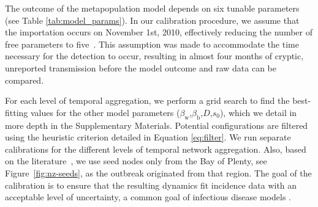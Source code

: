 \documentclass[aps,physrev,reprint,superscriptaddress]{revtex4-1}
\begin{document}
The outcome of the metapopulation model depends on six tunable parameters (see Table \ref{tab:model_params}). In our calibration procedure, we assume that the importation occurs on November 1st, 2010, effectively reducing the number of free parameters to five~\cite{rosanowski2013quantification,greer2012costs}. This assumption was made to accommodate the time necessary for the detection to occur, resulting in almost four months of cryptic, unreported transmission before the model outcome and raw data can be compared.

For each level of temporal aggregation, we perform a grid search to find the best-fitting values for the other model parameters ($\beta_\mathrm{w}$,$\beta_\mathrm{b}$,$D$,$s_0$), which we detail in more depth in the Supplementary Materials. Potential configurations are filtered using the heuristic criterion detailed in Equation \ref{eq:filter}. We run separate calibrations for the different levels of temporal network aggregation. Also, based on the literature~\cite{rosanowski2013quantification,greer2012costs}, we use seed nodes only from the Bay of Plenty, see Figure~\ref{fig:nz-seeds}, as the outbreak originated from that region. The goal of the calibration is to ensure that the resulting dynamics fit incidence data with an acceptable level of uncertainty, a common goal of infectious disease models  \cite{merler2015spatiotemporal}.
\end{document}
